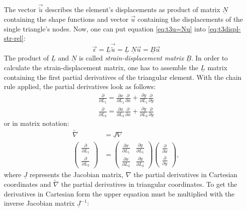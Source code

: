   The vector $\vec{\tilde{u}}$ describes the element's displacements as product of matrix $\underline{N}$ containing the shape functions and vector $\vec{u}$ containing the displacements of the single triangle's nodes. Now, one can put equation \ref{eq:t3u=Nu} into \ref{eq:t3displ-str-rel}:
  \begin{equation}\label{eq:t3eps=Bu}
  \vec{\epsilon} = \underline{L}\vec{\tilde{u}} = \underline{L}\;\underline{N} \vec{u} = \underline{B} \vec{u}
  \end{equation}
  The product of $\underline{L}$ and $\underline{N}$ is called \textit{strain-displacement matrix} $\underline{B}$.
  In order to calculate the strain-displacement matrix, one has to assemble the $\underline{L}$ matrix containing the first partial derivatives of the triangular element. With the chain rule applied, the partial derivatives look as follows:
  \begin{align}
  \frac{\partial}{\partial L_1} = \frac{\partial x}{\partial L_1} \frac{\partial}{\partial x} + \frac{\partial y}{\partial L_1} \frac{\partial}{\partial y} \nonumber\\
  \frac{\partial}{\partial L_2} = \frac{\partial x}{\partial L_2} \frac{\partial}{\partial x} + \frac{\partial y}{\partial L_2} \frac{\partial}{\partial y}
  \end{align}
  or in matrix notation:
  \begin{align}\label{eq:t3NablaTilde}
  \tilde{\nabla} &= \underline{J} \nabla \nonumber\\
  \begin{pmatrix}
  \frac{\partial}{\partial L_1}\\ \frac{\partial}{\partial L_2}
  \end{pmatrix} &= \begin{pmatrix}
  \frac{\partial x}{\partial L_1} & \frac{\partial y}{\partial L_1}\\
  \frac{\partial x}{\partial L_2} & \frac{\partial y}{\partial L_2}
  \end{pmatrix} \begin{pmatrix}
  \frac{\partial}{\partial x}\\ \frac{\partial}{\partial y}
  \end{pmatrix},
  \end{align}
  where $\underline{J}$ represents the Jacobian matrix, $\nabla$ the partial derivatives in Cartesian coordinates and $\tilde{\nabla}$ the partial derivatives in triangular coordinates. To get the derivatives in Cartesian form the upper equation must be multiplied with the inverse Jacobian matrix $\underline{J}^{-1}$:
